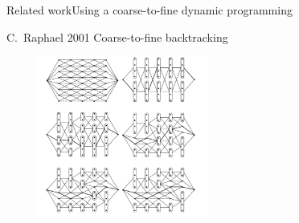 \begin{frame}{Related work}{Using a coarse-to-fine dynamic programming}
\begin{block}{C.~Raphael 2001\cite{Raphael2001}}
Coarse-to-fine backtracking
\end{block}
\begin{figure}
	\centering
	\includegraphics[width = 0.5\textwidth]{./figure/coarse_to_fine_DP}
\end{figure}
\end{frame}




